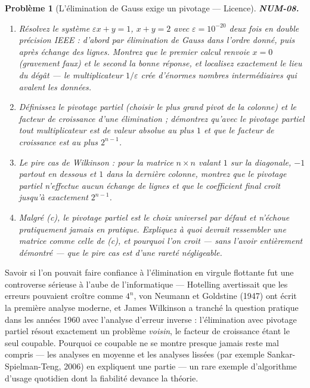 \documentclass[11pt]{article}
\newtheorem{problem}{Problème}
\begin{document}
\bigskip

\begin{problem}[{L'élimination de Gauss exige un pivotage --- Licence}]
\textbf{NUM-08.} \begin{enumerate}
\item[(a)] Résolvez le système
$\varepsilon x + y = 1$, $x + y = 2$ avec $\varepsilon = 10^{-20}$ deux fois en
double précision IEEE : d'abord par élimination de Gauss dans l'ordre donné, puis
après échange des lignes. Montrez que le premier calcul renvoie $x = 0$ (gravement
faux) et le second la bonne réponse, et localisez exactement le lieu du dégât --- le
multiplicateur $1/\varepsilon$ crée d'énormes nombres intermédiaires qui avalent les
données.
\item[(b)] Définissez le pivotage partiel (choisir le plus grand pivot de la colonne) et le
facteur de croissance d'une élimination ; démontrez qu'avec le pivotage partiel tout
multiplicateur est de valeur absolue au plus $1$ et que le facteur de croissance est
au plus $2^{n-1}$.
\item[(c)] Le pire cas de Wilkinson : pour la matrice $n \times n$ valant $1$ sur la
diagonale, $-1$ partout en dessous et $1$ dans la dernière colonne, montrez que le
pivotage partiel n'effectue aucun échange de lignes et que le coefficient final croît
jusqu'à exactement $2^{n-1}$.
\item[(d)] Malgré (c), le pivotage partiel est le choix universel par défaut et n'échoue
pratiquement jamais en pratique. Expliquez à quoi devrait ressembler une matrice
comme celle de (c), et pourquoi l'on croit --- sans l'avoir entièrement démontré --- que
le pire cas est d'une rareté négligeable.
\end{enumerate}

\end{problem}

\noindent Savoir si l'on pouvait faire confiance à l'élimination en virgule
flottante fut une controverse sérieuse à l'aube de l'informatique --- Hotelling
avertissait que les erreurs pouvaient croître comme $4^n$, von Neumann et Goldstine
(1947) ont écrit la première analyse moderne, et James Wilkinson a tranché la question
pratique dans les années 1960 avec l'analyse d'erreur inverse : l'élimination avec
pivotage partiel résout exactement un problème \textit{voisin}, le facteur de croissance
étant le seul coupable. Pourquoi ce coupable ne se montre presque jamais reste mal
compris --- les analyses en moyenne et les analyses lissées (par exemple
Sankar-Spielman-Teng, 2006) en expliquent une partie --- un rare exemple d'algorithme
d'usage quotidien dont la fiabilité devance la théorie.
\end{document}
